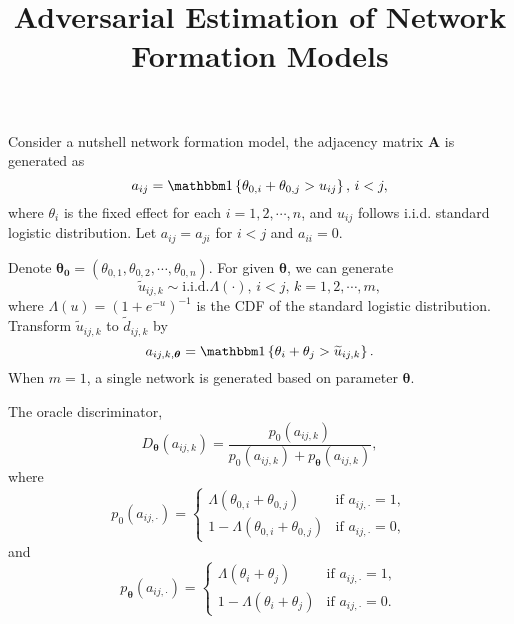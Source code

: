 



\title{Adversarial Estimation of Network Formation Models}
\date{}


\maketitle

\newpage

Consider a nutshell network formation model, the adjacency matrix \(\bm{A}\) is generated as 
\[
    a_{ij} = \I\left\{ \theta _{0, i} + \theta _{0,j} > u_{ij} \right\}, \, i< j, 
\]
where \(\theta _{i} \) is the fixed effect for each \(i = 1,2,\cdots, n\), and \(u_{ij} \) follows i.i.d. standard logistic distribution. Let \(a_{ij} = a_{ji} \) for \(i < j\) and \(a_{ii} = 0\).

Denote \(\bm{\theta_{0} } = \left( 
        \theta _{0, 1}, \theta _{0, 2}, \cdots, \theta _{0, n}  
    \right) 
\). For given \(\bm{\theta }\), we can generate
\[
    \widetilde{u}_{ij,k} \sim \text{i.i.d.}\Lambda\left( \cdot \right),\, i < j,\, k = 1, 2, \cdots, m,
\]
where \(\Lambda\left( u \right) = \left( 1 + e^{-u} \right)^{-1} \) is the CDF of the standard logistic distribution. Transform \(\widetilde{u}_{ij, k} \) to \(\widetilde{d}_{ij, k}\) by
\[
    a_{ij, k, \bm{\theta}} = \I \left\{ \theta _{i} + \theta _{j} > \widetilde{u}_{ij, k}  \right\} .
\]  
When \(m = 1\), a single network is generated based on parameter \(\bm{\theta }\).

The oracle discriminator,
\[
    D_{\bm{\theta } } \left( a_{ij, k}  \right) =  
    \frac{
        p_{0}\left( a_{ij, k}  \right)
    }{
        p_{0}\left( a_{ij, k}  \right) + p_{\bm{\theta } } \left( a_{ij, k}  \right)  
    },
\]
where
\[
    p_{0}\left( a_{ij, \cdot}  \right) = \begin{cases}
        \Lambda \left( \theta_{0, i} + \theta _{0, j} \right) & \text{if } a_{ij, \cdot} = 1,\\
        1 - \Lambda \left( \theta_{0, i} + \theta _{0, j} \right) & \text{if } a_{ij, \cdot} = 0,
    \end{cases}
\]
and
\[
    p_{\bm{\theta }}\left( a_{ij, \cdot}  \right) = \begin{cases}
        \Lambda \left( \theta_{i} + \theta _{j} \right) & \text{if } a_{ij,\cdot} = 1,\\
        1 - \Lambda \left( \theta_{i} + \theta _{j} \right) & \text{if } a_{ij,\cdot} = 0.
    \end{cases}
\]


